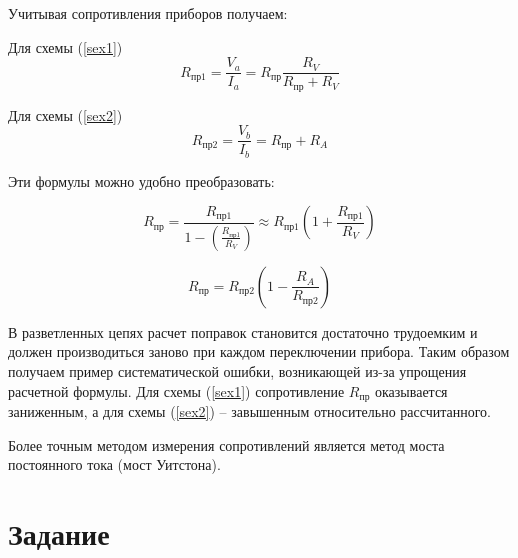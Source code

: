 	\begin{center}{Учитывая сопротивления приборов получаем:}
	\end{center}
	
	\begin{minipage}{0.45\textwidth}
		\centering
		Для схемы (\ref{sex1})
		\begin{equation}\label{r1}
			R_\text{пр1} = \frac{V_a}{I_a} = R_\text{пр}\frac{R_V}{R_\text{пр} + R_V}
		\end{equation}
	\end{minipage}
	\begin{minipage}{0.45\textwidth}
		\centering
		Для схемы (\ref{sex2})
		\begin{equation}\label{r2}
			R_\text{пр2} = \frac{V_b}{I_b} = R_\text{пр} + R_A
		\end{equation}
	\end{minipage}
	
	\begin{center}
		Эти формулы можно удобно преобразовать:
		
		\begin{minipage}{0.45\textwidth}
			\centering
			\begin{equation}\label{r3}
				R_\text{пр} = \frac{R_\text{пр1}}{1 - \left(\frac{R_\text{пр1}}{R_V} \right)} \approx R_\text{пр1}\left(1 + \frac{R_\text{пр1}}{R_V} \right)
			\end{equation}
		\end{minipage}
		\begin{minipage}{0.45\textwidth}
			\centering
			\begin{equation}\label{r4}
				R_\text{пр} = R_\text{пр2}\left(1-\frac{R_A}{R_\text{пр2}} \right)
			\end{equation}
		\end{minipage}
	\end{center}
	
	В разветленных цепях расчет поправок становится достаточно трудоемким и должен производиться заново при каждом переключении прибора. Таким образом получаем пример систематической ошибки, возникающей из-за упрощения расчетной формулы. Для схемы (\ref{sex1}) сопротивление $R_\text{пр}$ оказывается заниженным, а для схемы (\ref{sex2}) -- завышенным относительно рассчитанного.
	
	Более точным методом измерения сопротивлений является метод моста постоянного тока (мост Уитстона).
	
	\section{Задание}
